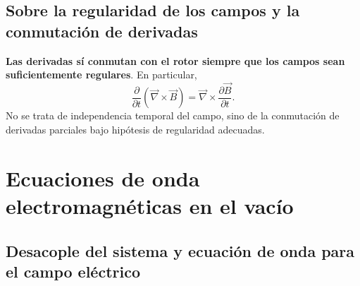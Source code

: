 \documentclass[12pt,a4paper]{article}
\theoremstyle{definition}
\theoremstyle{plain}
\numberwithin{equation}{section}
\theoremstyle{remark}
\newcommand{\B}{\vec{B}}
\begin{document}
\subsection{Sobre la regularidad de los campos y la conmutación de derivadas}

\textbf{Las derivadas sí conmutan con el rotor siempre que los campos sean suficientemente regulares}. En particular,
\begin{equation}
    \frac{\partial}{\partial t}(\vec\nabla\times\B)=\vec\nabla\times\frac{\partial\B}{\partial t}.
    \label{eq:conmutacion-rotor-tiempo}
\end{equation}
No se trata de independencia temporal del campo, sino de la conmutación de derivadas parciales bajo hipótesis de regularidad adecuadas.

\newpage

\section{Ecuaciones de onda electromagnéticas en el vacío}

\subsection{Desacople del sistema y ecuación de onda para el campo eléctrico}
\end{document}
